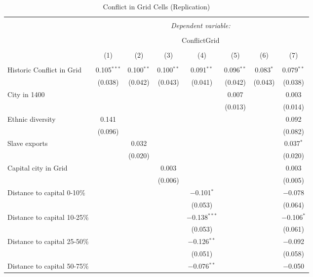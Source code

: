 
\begin{table}[!htbp] \centering 
  \caption{Conflict in Grid Cells (Replication)} 
  \label{} 
\footnotesize 
\begin{tabular}{@{\extracolsep{2pt}}lccccccc} 
\\[-1.8ex]\hline 
\hline \\[-1.8ex] 
 & \multicolumn{7}{c}{\textit{Dependent variable:}} \\ 
\cline{2-8} 
\\[-1.8ex] & \multicolumn{7}{c}{ConflictGrid} \\ 
\\[-1.8ex] & (1) & (2) & (3) & (4) & (5) & (6) & (7)\\ 
\hline \\[-1.8ex] 
 Historic Conflict in Grid & 0.105$^{***}$ & 0.100$^{**}$ & 0.100$^{**}$ & 0.091$^{**}$ & 0.096$^{**}$ & 0.083$^{*}$ & 0.079$^{**}$ \\ 
  & (0.038) & (0.042) & (0.043) & (0.041) & (0.042) & (0.043) & (0.038) \\ 
  City in 1400 &  &  &  &  & 0.007 &  & 0.003 \\ 
  &  &  &  &  & (0.013) &  & (0.014) \\ 
  Ethnic diversity & 0.141 &  &  &  &  &  & 0.092 \\ 
  & (0.096) &  &  &  &  &  & (0.082) \\ 
  Slave exports &  & 0.032 &  &  &  &  & 0.037$^{*}$ \\ 
  &  & (0.020) &  &  &  &  & (0.020) \\ 
  Capital city in Grid &  &  & 0.003 &  &  &  & 0.003 \\ 
  &  &  & (0.006) &  &  &  & (0.005) \\ 
  Distance to capital 0-10\% &  &  &  & $-$0.101$^{*}$ &  &  & $-$0.078 \\ 
  &  &  &  & (0.053) &  &  & (0.064) \\ 
  Distance to capital 10-25\% &  &  &  & $-$0.138$^{***}$ &  &  & $-$0.106$^{*}$ \\ 
  &  &  &  & (0.053) &  &  & (0.061) \\ 
  Distance to capital 25-50\% &  &  &  & $-$0.126$^{**}$ &  &  & $-$0.092 \\ 
  &  &  &  & (0.051) &  &  & (0.058) \\ 
  Distance to capital 50-75\% &  &  &  & $-$0.076$^{**}$ &  &  & $-$0.050 \\ 

\end{tabular}
\end{table}
